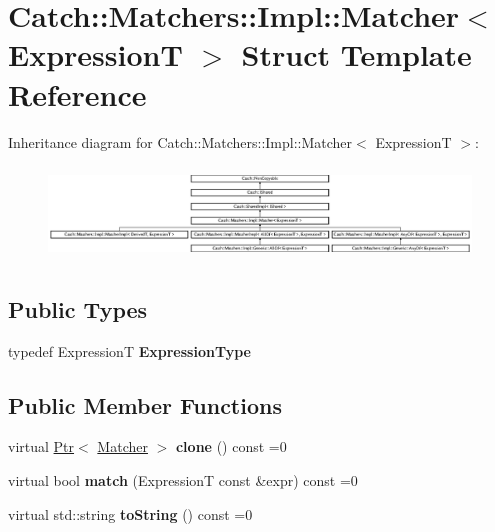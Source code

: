 \hypertarget{struct_catch_1_1_matchers_1_1_impl_1_1_matcher}{\section{Catch\-:\-:Matchers\-:\-:Impl\-:\-:Matcher$<$ Expression\-T $>$ Struct Template Reference}
\label{struct_catch_1_1_matchers_1_1_impl_1_1_matcher}
}
Inheritance diagram for Catch\-:\-:Matchers\-:\-:Impl\-:\-:Matcher$<$ Expression\-T $>$\-:\begin{figure}[H]
\begin{center}
\leavevmode
\includegraphics[height=2.505593cm]{struct_catch_1_1_matchers_1_1_impl_1_1_matcher}
\end{center}
\end{figure}
\subsection*{Public Types}
\begin{DoxyCompactItemize}
\item 
\hypertarget{struct_catch_1_1_matchers_1_1_impl_1_1_matcher_a7f5068cbacd1eed06cf243e63446e7e1}{typedef Expression\-T {\bfseries Expression\-Type}}\label{struct_catch_1_1_matchers_1_1_impl_1_1_matcher_a7f5068cbacd1eed06cf243e63446e7e1}

\end{DoxyCompactItemize}
\subsection*{Public Member Functions}
\begin{DoxyCompactItemize}
\item 
\hypertarget{struct_catch_1_1_matchers_1_1_impl_1_1_matcher_a9d31e5018fea24efa08c3cbf5aa4475d}{virtual \hyperlink{class_catch_1_1_ptr}{Ptr}$<$ \hyperlink{struct_catch_1_1_matchers_1_1_impl_1_1_matcher}{Matcher} $>$ {\bfseries clone} () const =0}\label{struct_catch_1_1_matchers_1_1_impl_1_1_matcher_a9d31e5018fea24efa08c3cbf5aa4475d}

\item 
\hypertarget{struct_catch_1_1_matchers_1_1_impl_1_1_matcher_a8c1c5511ce1f3738a45e6901b558f583}{virtual bool {\bfseries match} (Expression\-T const \&expr) const =0}\label{struct_catch_1_1_matchers_1_1_impl_1_1_matcher_a8c1c5511ce1f3738a45e6901b558f583}

\item 
\hypertarget{struct_catch_1_1_matchers_1_1_impl_1_1_matcher_a091bcc37e589967d7e10fc7790d820e2}{virtual std\-::string {\bfseries to\-String} () const =0}\label{struct_catch_1_1_matchers_1_1_impl_1_1_matcher_a091bcc37e589967d7e10fc7790d820e2}

\end{DoxyCompactItemize}
